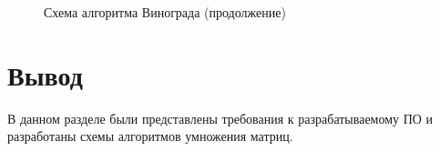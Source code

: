 \begin{figure}
	\caption{Схема алгоритма Винограда (продолжение)}
\end{figure}

\newpage
\section{Вывод}
В данном разделе были представлены требования к разрабатываемому ПО и разработаны схемы алгоритмов умножения матриц.